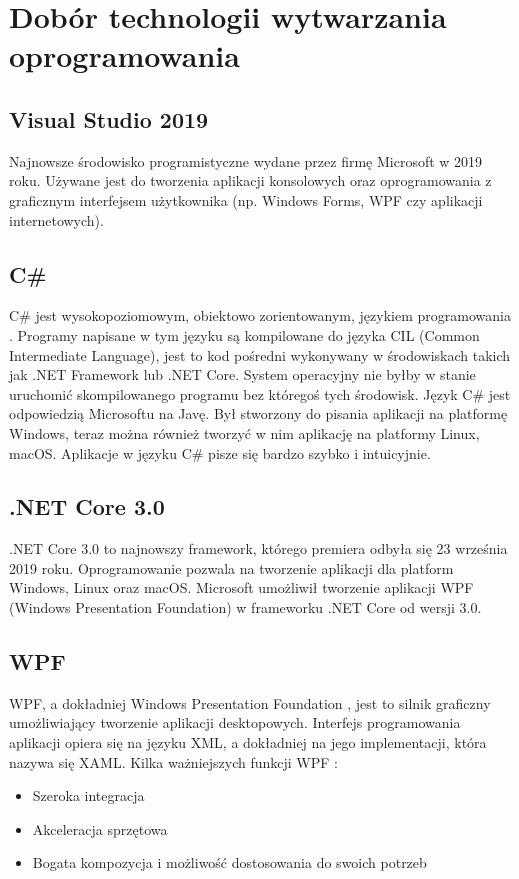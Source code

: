\section{Dobór technologii wytwarzania oprogramowania}
\subsection{Visual Studio 2019}
Najnowsze środowisko programistyczne \cite{VisualStudio} wydane przez firmę Microsoft w 2019 roku. Używane jest do tworzenia aplikacji konsolowych oraz oprogramowania z graficznym interfejsem użytkownika (np. Windows Forms, WPF czy aplikacji internetowych).

\subsection{C\#}
C\# \cite{CSharp} jest wysokopoziomowym, obiektowo zorientowanym, językiem programowania  \cite{CSharpBook}. Programy napisane w tym języku są kompilowane do języka CIL (Common Intermediate Language), jest to kod pośredni wykonywany w środowiskach takich jak .NET Framework lub .NET Core. System operacyjny nie byłby w stanie uruchomić skompilowanego programu bez któregoś tych środowisk. Język C\# jest odpowiedzią Microsoftu na Javę. Był stworzony do pisania aplikacji na platformę Windows, teraz można również tworzyć w nim aplikację na platformy Linux, macOS. Aplikacje w języku C\# pisze się bardzo szybko i intuicyjnie. 

\subsection{.NET Core 3.0}
.NET Core 3.0 \cite{NetCore} to najnowszy framework, którego premiera odbyła się 23 września 2019 roku. Oprogramowanie pozwala na tworzenie aplikacji dla platform Windows, Linux oraz macOS. Microsoft umożliwił tworzenie aplikacji WPF (Windows Presentation Foundation) w frameworku .NET Core od wersji 3.0. 

\subsection{WPF}
WPF, a dokładniej Windows Presentation Foundation \cite{WPF}, jest to silnik graficzny umożliwiający tworzenie aplikacji desktopowych. Interfejs programowania aplikacji opiera się na języku XML, a dokładniej na jego implementacji, która nazywa się XAML. Kilka ważniejszych funkcji WPF \cite{WPFBook} :  %
\begin{itemize}
    \item Szeroka integracja
    \item Akceleracja sprzętowa
    \item Bogata kompozycja i możliwość dostosowania do swoich potrzeb
\end{itemize}


